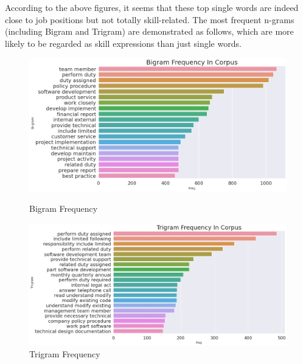 According to the above figures, it seems that these top single words are indeed close to job positions but not totally skill-related. The most frequent n-grams (including Bigram and Trigram) are demonstrated as follows, which are more likely to be regarded as skill expressions than just single words. 

\begin{figure}[H]
    \begin{minipage}[t]{0.5\linewidth}
        \centering
        \includegraphics[scale=0.2]{images/bigram.png}
        \caption{Bigram Frequency}
        \label{fig:25}
    \end{minipage}%
    \begin{minipage}[t]{0.5\linewidth}
        \centering
        \includegraphics[scale=0.2]{images/trigram.png}
        \caption{Trigram Frequency}
        \label{fig:26}
    \end{minipage}
\end{figure}



